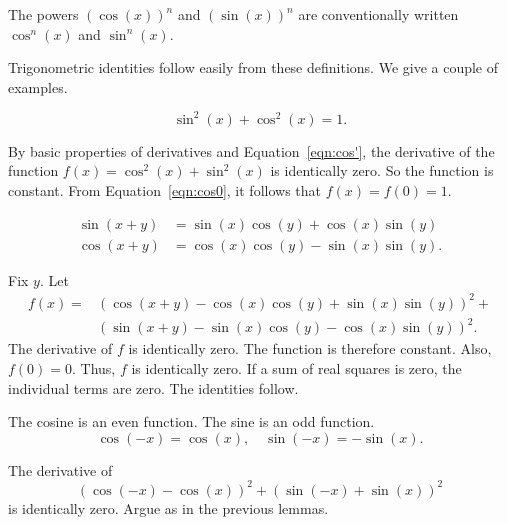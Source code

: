 The powers $(\cos(x))^n$ and $(\sin(x))^n$ are conventionally written
$\cos^n(x)$ and $\sin^n(x)$.

Trigonometric identities follow easily from these definitions.  We
give a couple of examples.

\begin{lemma}\label{lemma:circle} 
   $$\sin^2(x) + \cos^2(x) = 1.$$
\end{lemma}

\begin{proved}
By basic properties of derivatives and Equation~\ref{eqn:cos'},
the derivative of the function $f(x) = \cos^2(x) +\sin^2(x)$ is
identically zero.   So the function is constant.  From
Equation~\ref{eqn:cos0}, it follows that $f(x)=f(0)=1$.
\swallowed\end{proved}


\begin{lemma}\label{lemma:sin-add}
  $$\begin{array}{lll}
  \sin(x+y) &= \sin(x)\cos(y) + \cos(x)\sin(y)\\
  \cos(x+y)  &= \cos(x)\cos(y) - \sin(x)\sin(y).
  \end{array}$$
\end{lemma}

\begin{proved}
Fix $y$.  Let
    $$\begin{array}{lll}
    f(x) = &(\cos(x+y) - \cos(x)\cos(y) +
    \sin(x)\sin(y))^2 +\\ & (\sin(x+y) -\sin(x)\cos(y) -
    \cos(x)\sin(y))^2.
    \end{array}$$
The derivative of $f$ is identically zero.  The function is
therefore constant. Also, $f(0)=0$.  Thus, $f$ is identically zero.
If a sum of real squares is zero, the individual terms are zero. The
identities follow.
\swallowed\end{proved}

\begin{lemma}\label{lemma:cos-neg}
The cosine is an even function.  The sine is an odd
function.
    $$\cos(-x) = \cos(x),\quad\sin(-x) = -\sin(x).$$
\end{lemma}


\begin{proved}
The derivative of
    $$(\cos(-x) - \cos(x))^2 + (\sin(-x) +\sin(x))^2$$
is identically zero.  Argue as in the previous lemmas.
\swallowed\end{proved}


